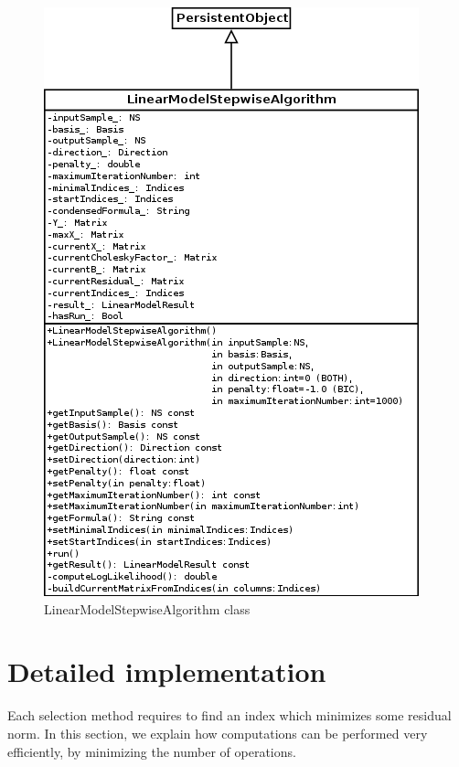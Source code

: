 \begin{figure}[htb]
  \begin{center}
    \includegraphics[scale=0.5]{LinearModelStepwiseAlgorithm.png}
    \caption{LinearModelStepwiseAlgorithm class}\label{fig:archi:LinearModelStepwiseAlgorithm}
  \end{center}
\end{figure}

\section{Detailed implementation}

Each selection method requires to find an index which minimizes some residual norm.
In this section, we explain how computations can be performed very efficiently, by
minimizing the number of operations.

